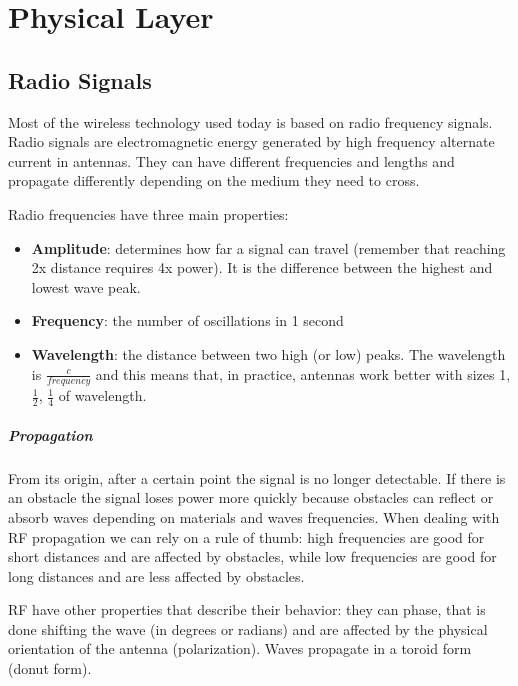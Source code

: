 \chapter{Physical Layer}

\section{Radio Signals}
Most of the wireless technology used today is based on radio frequency 
signals. 
Radio signals are electromagnetic energy generated by high frequency 
alternate current in antennas. They can have different frequencies and lengths 
and propagate differently depending on the medium they need to cross.

Radio frequencies have three main properties:
\begin{itemize}
\item \textbf{Amplitude}: determines how far a signal can 
  travel (remember that reaching 2x distance requires 4x power). It is the 
  difference between the highest and lowest wave peak.
\item \textbf{Frequency}: the number of oscillations in 1 second
\item \textbf{Wavelength}: the distance between two high (or low) peaks. The wavelength is $\frac{c}{frequency}$ and this means that, in practice, antennas work better with sizes 1, $\frac{1}{2}$, $\frac{1}{4}$ of wavelength.
\end{itemize}

\paragraph*{Propagation} From its origin, after a certain point the 
signal is no longer detectable. If there is an obstacle the signal loses power 
more quickly because obstacles can reflect or absorb waves depending on 
materials and waves frequencies.
When dealing with RF propagation we can rely on a rule of thumb: high 
frequencies are good for short distances and are affected by obstacles, while 
low frequencies are good for long distances and are less affected by obstacles.

RF have other properties that describe their behavior: they can phase, 
that is done shifting the wave (in degrees or radians) and are affected by the
physical orientation of the antenna (polarization).
Waves propagate in a toroid form (donut form).

